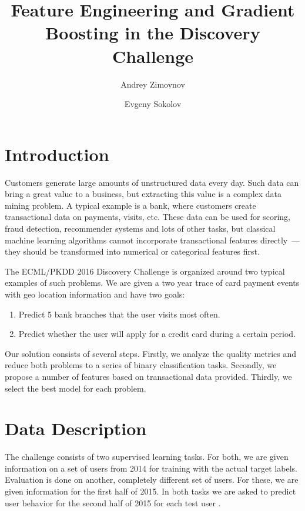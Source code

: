 \documentclass{llncs}
\title{Feature Engineering and Gradient Boosting in the Discovery Challenge}
\author{Andrey Zimovnov \and Evgeny Sokolov}
\institute{Yandex Data Factory}
\begin{document}
	
	\maketitle
	
	\section{Introduction}
	
	Customers generate large amounts of unstructured data every day. Such data can bring a great value to a business, but extracting this value is a complex data mining problem. A typical example is a bank, where customers create transactional data on payments, visits, etc. These data can be used for scoring, fraud detection, recommender systems and lots of other tasks, but classical machine learning algorithms cannot incorporate transactional features directly~— they should be transformed into numerical or categorical features first.
	
	The ECML/PKDD 2016 Discovery Challenge is organized around two typical examples of such problems. We are given a two year trace of card payment events with geo location information and have two goals:
	\begin{enumerate}
		\item Predict 5 bank branches that the user visits most often.
		\item Predict whether the user will apply for a credit card during a certain period.
	\end{enumerate}
	
	Our solution consists of several steps. Firstly, we analyze the quality metrics and reduce both problems to a series of binary classification tasks. Secondly, we propose a number of features based on transactional data provided. Thirdly, we select the best model for each problem.
	
	\section{Data Description}
	
	The challenge consists of two supervised learning tasks. For both, we are given information on a set of users from 2014 for training with the actual target labels. Evaluation is done on another, completely different set of users. For these, we are given information for the first half of 2015. In both tasks we are asked to predict user behavior for the second half of 2015 for each test user \cite{competition_page}.
	
\end{document}
